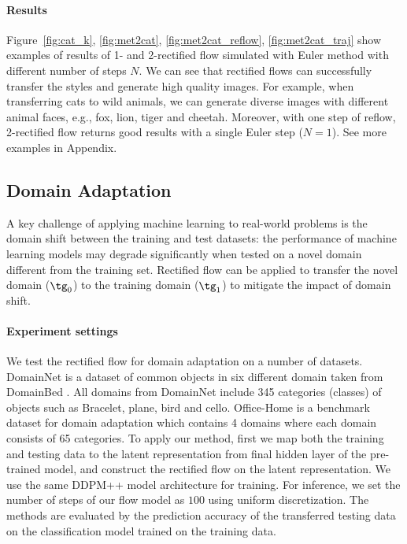 \documentclass[11pt]{article}
\begin{document}
\paragraph{Results}
Figure~\ref{fig:cat_k}, \ref{fig:met2cat}, \ref{fig:met2cat_reflow}, \ref{fig:met2cat_traj} 
show examples of results of 1- and 2-rectified flow simulated with Euler method with different number of steps $N$.  
We can see that rectified flows can successfully transfer the styles and generate high quality images. 
For example, when transferring cats to wild animals,  
we can generate diverse images with different animal faces, {e.g.}, fox, lion, tiger and cheetah. 
Moreover, with one step of reflow, 2-rectified flow returns good results with a single Euler step ($N=1$).  
See more examples in Appendix. 



\subsection{Domain Adaptation} 
A key challenge of applying machine learning  to  real-world problems is the domain shift between the training and test datasets: the performance of machine learning models may degrade significantly 
when tested on a novel domain different from the training set.  
Rectified flow can be applied to transfer the novel domain ($\tg_0$) to the training domain ($\tg_1$) to mitigate the impact of domain shift. 

\paragraph{Experiment settings} We test the rectified flow for domain adaptation on 
a number of datasets. 
DomainNet \citep{peng2019domainnet} is a dataset of common objects in six different domain taken from DomainBed  \citep{gulrajani2020search}. %
All domains  from DomainNet  include 345 categories (classes) of objects such as Bracelet, plane, bird and cello. 
Office-Home \citep{venkateswara2017officehome} is a benchmark dataset for domain adaptation which contains 4 domains where each domain consists of 65 categories. 
To apply our method, 
first we map both the training and testing data 
to the latent representation from final hidden layer of the pre-trained model, and construct the rectified flow on the latent representation. 
We use the same DDPM++ model architecture %
for training. %
For inference, we set the number of steps of our flow model as $100$ using uniform discretization.
The methods are evaluated by the prediction accuracy of the transferred testing data 
on the classification model trained on the training data. 
\end{document}
